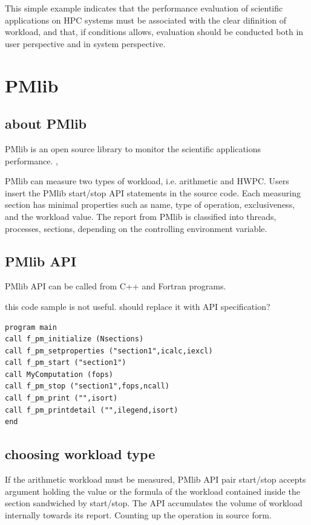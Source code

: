\documentclass[conference]{IEEEtran}
\begin{document}
This simple example indicates that the performance evaluation of
scientific applications on HPC systems must be associated with the clear
difinition of workload, and that, if conditions allows, evaluation should be
conducted both in user perspective and in system perspective.

\section{PMlib}
\label{section:PMlib}

\subsection {about PMlib}

PMlib is an open source library to monitor the scientific applications
performance. 
\cite{PMlib:webpage-public},

PMlib can measure two types of workload, i.e. arithmetic and HWPC.
Users insert the PMlib start/stop API statements in the source code.
Each measuring section has minimal properties such as name, type of operation,
exclusiveness, and the workload value.
The report from PMlib is classified into threads, processes, sections,
depending on the controlling environment variable.


\subsection {PMlib API}
PMlib API can be called from C++ and Fortran programs.

{\color{blue} this code sample is not useful. should replace it
with API specification?}
\begin{lstlisting}
program main
call f_pm_initialize (Nsections)
call f_pm_setproperties ("section1",icalc,iexcl)
call f_pm_start ("section1")
call MyComputation (fops)
call f_pm_stop ("section1",fops,ncall)
call f_pm_print ("",isort)
call f_pm_printdetail ("",ilegend,isort)
end
\end{lstlisting}


\subsection {choosing workload type}
If the arithmetic workload must be measured,
PMlib API pair start/stop accepts argument holding the value or the formula
of the workload contained inside the section sandwiched by start/stop.
The API accumulates the volume of workload internally towards its report.
Counting up the operation in source form.
\end{document}
